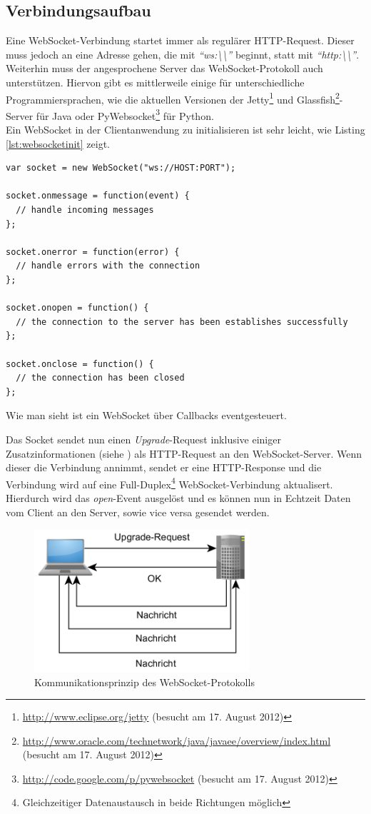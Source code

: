\subsection{Verbindungsaufbau}
Eine WebSocket-Verbindung startet immer als regulärer HTTP-Request. Dieser muss jedoch an eine Adresse gehen, die mit \textit{"`ws:\textbackslash\textbackslash"'} beginnt, statt mit \textit{"`http:\textbackslash\textbackslash"'}. Weiterhin muss der angesprochene Server das WebSocket-Protokoll auch unterstützen. Hiervon gibt es mittlerweile einige für unterschiedliche Programmiersprachen, wie die aktuellen Versionen der Jetty\footnote{\url{http://www.eclipse.org/jetty} (besucht am 17. August 2012)} und Glassfish\footnote{\url{http://www.oracle.com/technetwork/java/javaee/overview/index.html} (besucht am 17. August 2012)}-Server für Java oder PyWebsocket\footnote{\url{http://code.google.com/p/pywebsocket} (besucht am 17. August 2012)} für Python.\\
Ein WebSocket in der Clientanwendung zu initialisieren ist sehr leicht, wie Listing \ref{lst:websocketinit} zeigt.
\lstset{language=JavaScript}
\begin{lstlisting}[caption={Initialisieren einer WebSocket-Verbindung im Browser}, label={lst:websocketinit}]
var socket = new WebSocket("ws://HOST:PORT");

socket.onmessage = function(event) {
  // handle incoming messages
};

socket.onerror = function(error) {
  // handle errors with the connection
};

socket.onopen = function() {
  // the connection to the server has been establishes successfully
};

socket.onclose = function() {
  // the connection has been closed
};
\end{lstlisting}
Wie man sieht ist ein WebSocket über Callbacks eventgesteuert.

Das Socket sendet nun einen \textit{Upgrade}-Request inklusive einiger Zusatzinformationen (siehe \autocite{WebsocketsRichter}) als HTTP-Request an den WebSocket-Server. Wenn dieser die Verbindung annimmt, sendet er eine HTTP-Response und die Verbindung wird auf eine Full-Duplex\footnote{Gleichzeitiger Datenaustausch in beide Richtungen möglich} WebSocket-Verbindung aktualisert. Hierdurch wird das \textit{open}-Event ausgelöst und es können nun in Echtzeit Daten vom Client an den Server, sowie vice versa gesendet werden.
\begin{figure}
\centering
\includegraphics[width=80mm]{bilder/websocket.png}
\caption{Kommunikationsprinzip des WebSocket-Protokolls}
\label{fig:websocket}
\end{figure}

